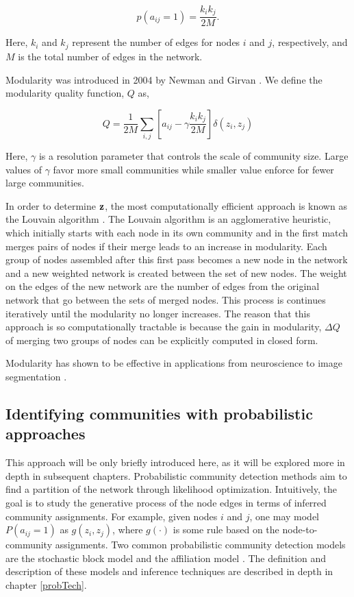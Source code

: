 \begin{equation}
p(a_{ij}=1)=\frac{k_{i}k_{j}}{2M}.
\end{equation}

Here, $k_{i}$ and $k_{j}$ represent the number of edges for nodes $i$ and $j$, respectively, and $M$ is the total number of edges in the network. 

\indent Modularity was introduced in 2004 by Newman and Girvan \cite{newmangirvan}. We define the modularity quality function, $Q$ as,

\begin{equation}
Q=\frac{1}{2M}\sum_{i,j}\left[a_{ij}-\gamma \frac{k_{i}k_{j}}{2M}\right]\delta(z_{i},z_{j})
\end{equation} 

Here, $\gamma$ is a resolution parameter \cite{resParam} that controls the scale of community size. Large values of $\gamma$ favor more small communities while smaller value enforce for fewer large communities. 

\indent In order to determine ${\bf z}$, the most computationally efficient approach is known as the Louvain algorithm \cite{blondel}. The Louvain algorithm is an agglomerative heuristic, which initially starts with each node in its own community and in the first match merges pairs of nodes if their merge leads to an increase in modularity. Each group of nodes assembled after this first pass becomes a new node in the network and a new weighted network is created between the set of new nodes. The weight on the edges of the new network are the number of edges from the original network that go between the sets of merged nodes. This process is continues iteratively until the modularity no longer increases. The reason that this approach is so computationally tractable is because the gain in modularity, $\Delta Q$ of merging two groups of nodes can be explicitly computed in closed form.

\indent Modularity has shown to be effective in applications from neuroscience \cite{hierarchicalmod} to image segmentation \cite{browet}.

\subsection{Identifying communities with probabilistic approaches}

\indent This approach will be only briefly introduced here, as it will be explored more in depth in subsequent chapters. Probabilistic community detection methods aim to find a partition of the network through likelihood optimization. Intuitively, the goal is to study the generative process of the node edges in terms of inferred community assignments. For example, given nodes $i$ and $j$, one may model $P(a_{ij}=1)$ as $g(z_{i},z_{j})$, where $g(\cdot)$ is some rule based on the node-to-community assignments. Two common probabilistic community detection models are the stochastic block model \cite{originalSBM} and the affiliation model \cite{affil}. The definition and description of these models and inference techniques are described in depth in chapter \ref{probTech}.

